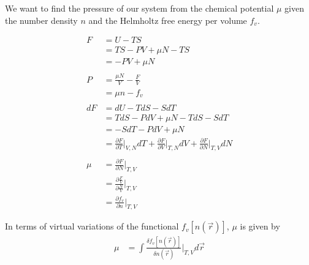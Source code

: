\documentclass[double,12pt]{beavtex}
\begin{document}
We want to find the pressure of our system from the chemical potential $\mu$
given the number density $n$ and the Helmholtz free energy per volume $f_v$. 

\begin{align}
	F &= U - TS  \\
	  &= TS -PV + \mu N - TS  \\
	  &= -PV + \mu N  \\ \nonumber\\
%
	P &= \frac{\mu N}{V} - \frac{F}{V} \\
	  &= \mu n - f_v   \\ \nonumber\\
%
	dF &= dU - TdS -SdT \\
	   &= TdS - PdV + \mu N  - TdS -SdT\\
	   &=  -SdT - PdV + \mu N \\
	   &= \frac{\partial F}{\partial T}\bigg|_{V,N}dT 
	       + \frac{\partial F}{\partial V}\bigg|_{T,N}dV 
	       + \frac{\partial F}{\partial N}\bigg|_{T,V}dN \\ \nonumber\\
%
    \mu &= \frac{\partial F}{\partial N}\bigg|_{T,V} \\
        &= \frac{\partial \frac{F}{V}}{\partial \frac{N}{V}}\bigg|_{T,V} \\
        &= \frac{\partial f_v}{\partial n}\bigg|_{T,V}  
\end{align}

In terms of virtual variations of the functional $f_v[n(\vec r)]$, 
$\mu$ is given by
\begin{align}
    \mu &= \int \frac{\delta f_v[n(\vec r)]}{\delta n(\vec r)}\bigg|_{T,V} d\vec{r}
\end{align}
\end{document}
